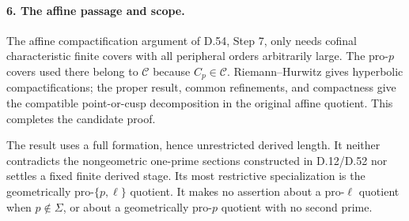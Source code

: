 \paragraph{6. The affine passage and scope.}

The affine compactification argument of D.54, Step 7, only needs
cofinal characteristic finite covers with all peripheral orders
arbitrarily large.  The pro-$p$ covers used there belong to
$\mathcal C$ because $C_p\in\mathcal C$.  Riemann--Hurwitz gives
hyperbolic compactifications; the proper result, common refinements,
and compactness give the compatible point-or-cusp decomposition
in the original affine quotient.  This completes the candidate
proof.

The result uses a full formation, hence unrestricted derived
length.  It neither contradicts the nongeometric one-prime
sections constructed in D.12/D.52 nor settles a fixed finite
derived stage.  Its most restrictive specialization is the
geometrically pro-$\{p,\ell\}$ quotient.  It makes no assertion
about a pro-$\ell$ quotient when $p\notin\Sigma$, or about a
geometrically pro-$p$ quotient with no second prime.
